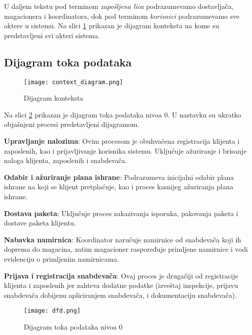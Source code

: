 \begin{itemize}
		U daljem tekstu pod terminom \textit{zapošljena lica} podrazumevamo dostavljača, magacionera i koordinatora, dok pod terminom \textit{korisnici} podrazumevamo sve aktere u sistemu. Na slici \ref{fig:context_diagram} prikazan je dijagram konteksta na kome su predstavljeni svi akteri sistema.
		
				
	\end{itemize}
\subsection{Dijagram toka podataka}

\begin{figure}[H]
	\begin{center}
		\texttt{[image: context\_diagram.png]}

	    \caption{Dijagram konteksta}
	\label{fig:context_diagram}
    \end{center}
    
\end{figure}

	Na slici \ref{fig:DFD} prikazan je dijagram toka podataka nivoa 0. U nastavku su ukratko objašnjeni procesi predstavljeni dijagramom.
	
	
	\textbf{Upravljanje nalozima}: Ovim procesom je obuhvaćena registracija klijenta i zaposlenih, kao i prijavljivanje korisnika sistemu. Uključuje ažuriranje i brisanje naloga klijenta, zaposlenih i snabdevača.
	
	\textbf{Odabir i ažuriranje plana ishrane}: Podrazumeva inicijalni odabir plana ishrane na koji se klijent pretplaćuje, kao i proces kasnijeg ažuriranja plana ishrane.
		
	\textbf{Dostava paketa}: Uključuje proces zakazivanja isporuka, pakovanja paketa i dostave paketa klijentu. 
	
	
	\textbf{Nabavka namirnica}: Koordinator naručuje namirnice od snabdevača koji ih doprema do magacina, zatim magacioner raspoređuje primljene namirnice i vodi evidenciju o primljenim namirnicama.
	
	
	\textbf{Prijava i registracija snabdevača}: Ovaj proces je drugačiji od registracije klijenta i zaposlenih jer zahteva dodatne podatke (izveštaj inspekcije, prijavu snabdevača dobijenu apliciranjem snabdevača, i dokumentaciju snabdevača).


\begin{figure}[H]
	\begin{center}
		\texttt{[image: dfd.png]}

    		\caption{Dijagram toka podataka nivoa 0}
    \label{fig:DFD}
    \end{center}
 
\end{figure}

	